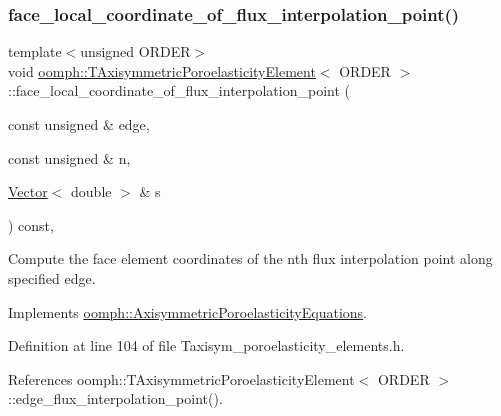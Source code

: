 \subsubsection{\texorpdfstring{face\+\_\+local\+\_\+coordinate\+\_\+of\+\_\+flux\+\_\+interpolation\+\_\+point()}{face\_local\_coordinate\_of\_flux\_interpolation\_point()}}
{\footnotesize\ttfamily template$<$unsigned O\+R\+D\+ER$>$ \\
void \hyperlink{classoomph_1_1TAxisymmetricPoroelasticityElement}{oomph\+::\+T\+Axisymmetric\+Poroelasticity\+Element}$<$ O\+R\+D\+ER $>$\+::face\+\_\+local\+\_\+coordinate\+\_\+of\+\_\+flux\+\_\+interpolation\+\_\+point (\begin{DoxyParamCaption}\item[{const unsigned \&}]{edge,  }\item[{const unsigned \&}]{n,  }\item[{\hyperlink{classoomph_1_1Vector}{Vector}$<$ double $>$ \&}]{s }\end{DoxyParamCaption}) const\hspace{0.3cm}{\ttfamily [inline]}, {\ttfamily [virtual]}}



Compute the face element coordinates of the nth flux interpolation point along specified edge. 



Implements \hyperlink{classoomph_1_1AxisymmetricPoroelasticityEquations_a5e84b1b9a6baa7b5fa83ad32c2734cfb}{oomph\+::\+Axisymmetric\+Poroelasticity\+Equations}.



Definition at line 104 of file Taxisym\+\_\+poroelasticity\+\_\+elements.\+h.



References oomph\+::\+T\+Axisymmetric\+Poroelasticity\+Element$<$ O\+R\+D\+E\+R $>$\+::edge\+\_\+flux\+\_\+interpolation\+\_\+point().

\mbox{\label{classoomph_1_1TAxisymmetricPoroelasticityElement_a8099e78155f0a3a042b57e35756847e1}} 
